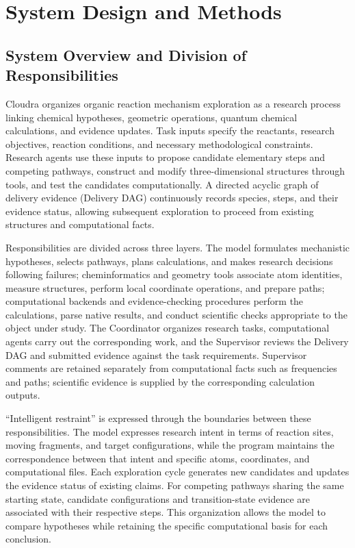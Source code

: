 \section{System Design and Methods}

\subsection{System Overview and Division of Responsibilities}

Cloudra organizes organic reaction mechanism exploration as a research process linking chemical hypotheses, geometric operations, quantum chemical calculations, and evidence updates. Task inputs specify the reactants, research objectives, reaction conditions, and necessary methodological constraints. Research agents use these inputs to propose candidate elementary steps and competing pathways, construct and modify three-dimensional structures through tools, and test the candidates computationally. A directed acyclic graph of delivery evidence (Delivery DAG) continuously records species, steps, and their evidence status, allowing subsequent exploration to proceed from existing structures and computational facts.

Responsibilities are divided across three layers. The model formulates mechanistic hypotheses, selects pathways, plans calculations, and makes research decisions following failures; cheminformatics and geometry tools associate atom identities, measure structures, perform local coordinate operations, and prepare paths; computational backends and evidence-checking procedures perform the calculations, parse native results, and conduct scientific checks appropriate to the object under study. The Coordinator organizes research tasks, computational agents carry out the corresponding work, and the Supervisor reviews the Delivery DAG and submitted evidence against the task requirements. Supervisor comments are retained separately from computational facts such as frequencies and paths; scientific evidence is supplied by the corresponding calculation outputs.

“Intelligent restraint” is expressed through the boundaries between these responsibilities. The model expresses research intent in terms of reaction sites, moving fragments, and target configurations, while the program maintains the correspondence between that intent and specific atoms, coordinates, and computational files. Each exploration cycle generates new candidates and updates the evidence status of existing claims. For competing pathways sharing the same starting state, candidate configurations and transition-state evidence are associated with their respective steps. This organization allows the model to compare hypotheses while retaining the specific computational basis for each conclusion.

